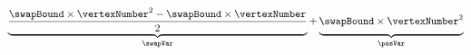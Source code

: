 \begin{equation}
    \underbrace{\frac{\swapBound \times \vertexNumber^2 - \swapBound \times \vertexNumber}{2}}_{\swapVar} + 
    \underbrace{\vphantom{\frac{1}{2}}\swapBound \times 
    \vertexNumber^2}_{\posVar}
    \label{equ:vars}
\end{equation}
